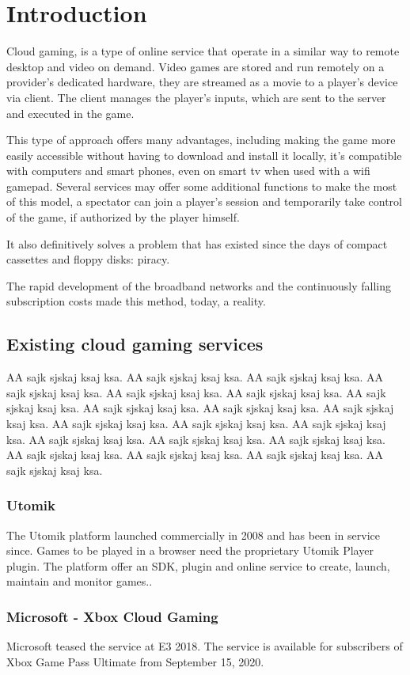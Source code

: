 \chapter{Introduction}
\label{cap:introduction}
Cloud gaming, is a type of online service that operate in a similar way to remote desktop and video on demand. Video games are stored and run remotely on a provider's dedicated hardware, they are streamed as a movie to a player's device via client. The client manages the player's inputs, which are sent to the server and executed in the game.

This type of approach offers many advantages, including making the game more easily accessible without having to download and install it locally, it's compatible with computers and smart phones, even on smart tv when used with a wifi gamepad. Several services may offer some additional functions to make the most of this model, a spectator can join a player's session and temporarily take control of the game, if authorized by the player himself.

It also definitively solves a problem that has existed since the days of compact cassettes and floppy disks: piracy.

The rapid development of the broadband networks and the continuously falling subscription costs made this method, today, a reality.
\section{Existing cloud gaming services}
AA sajk sjskaj ksaj ksa. AA sajk sjskaj ksaj ksa. AA sajk sjskaj ksaj ksa. AA sajk sjskaj ksaj ksa. AA sajk sjskaj ksaj ksa. AA sajk sjskaj ksaj ksa. AA sajk sjskaj ksaj ksa. AA sajk sjskaj ksaj ksa. AA sajk sjskaj ksaj ksa. AA sajk sjskaj ksaj ksa. AA sajk sjskaj ksaj ksa. AA sajk sjskaj ksaj ksa. AA sajk sjskaj ksaj ksa. AA sajk sjskaj ksaj ksa. AA sajk sjskaj ksaj ksa. AA sajk sjskaj ksaj ksa. AA sajk sjskaj ksaj ksa. AA sajk sjskaj ksaj ksa. AA sajk sjskaj ksaj ksa. AA sajk sjskaj ksaj ksa.
\subsection{Utomik}
The Utomik platform launched commercially in 2008 and has been in service since. Games to be played in a browser need the proprietary Utomik Player plugin. The platform offer an SDK, plugin and online service to create, launch, maintain and monitor games.\cite{Utomik}.
\subsection{Microsoft - Xbox Cloud Gaming}
Microsoft teased the service at E3 2018. The service is available for subscribers of Xbox Game Pass Ultimate from September 15, 2020\cite{Xbox_Game_Pass_cloud_gaming}.
